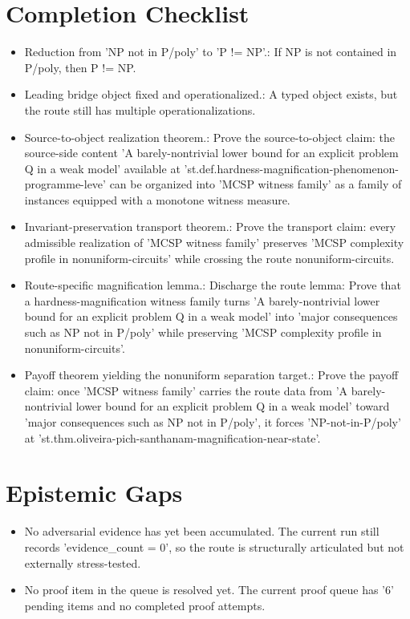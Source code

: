 \documentclass[11pt]{article}
\begin{document}
\section{Completion Checklist}
\begin{itemize}[leftmargin=*,itemsep=0.2em]
\item [ESTABLISHED] Reduction from 'NP not in P/poly' to 'P != NP'.: If NP is not contained in P/poly, then P != NP.
\item [PARTIAL] Leading bridge object fixed and operationalized.: A typed object exists, but the route still has multiple operationalizations.
\item [OPEN] Source-to-object realization theorem.: Prove the source-to-object claim: the source-side content 'A barely-nontrivial lower bound for an explicit problem Q in a weak model' available at 'st.def.hardness-magnification-phenomenon-programme-leve' can be organized into 'MCSP witness family' as a family of instances equipped with a monotone witness measure.
\item [OPEN] Invariant-preservation transport theorem.: Prove the transport claim: every admissible realization of 'MCSP witness family' preserves 'MCSP complexity profile in nonuniform-circuits' while crossing the route nonuniform-circuits.
\item [OPEN] Route-specific magnification lemma.: Discharge the route lemma: Prove that a hardness-magnification witness family turns 'A barely-nontrivial lower bound for an explicit problem Q in a weak model' into 'major consequences such as NP not in P/poly' while preserving 'MCSP complexity profile in nonuniform-circuits'.
\item [OPEN] Payoff theorem yielding the nonuniform separation target.: Prove the payoff claim: once 'MCSP witness family' carries the route data from 'A barely-nontrivial lower bound for an explicit problem Q in a weak model' toward 'major consequences such as NP not in P/poly', it forces 'NP-not-in-P/poly' at 'st.thm.oliveira-pich-santhanam-magnification-near-state'.
\end{itemize}

\section{Epistemic Gaps}
\begin{itemize}[leftmargin=*,itemsep=0.2em]
\item No adversarial evidence has yet been accumulated. The current run still records 'evidence\_count = 0', so the route is structurally articulated but not externally stress-tested.
\item No proof item in the queue is resolved yet. The current proof queue has '6' pending items and no completed proof attempts.
\end{itemize}
\end{document}
